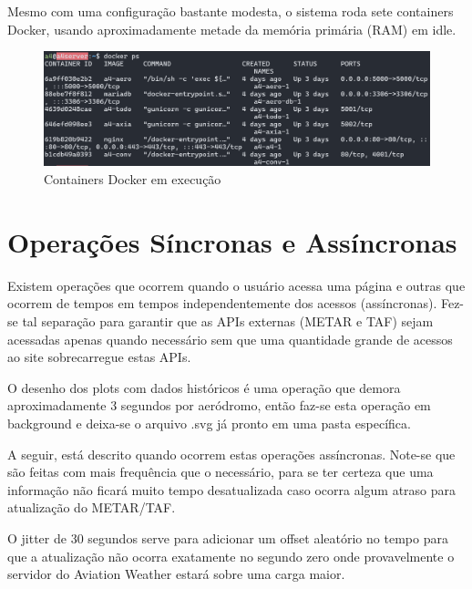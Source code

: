 Mesmo com uma configuração bastante modesta, o sistema roda sete containers Docker, usando 
aproximadamente metade da memória primária (RAM) em idle.

\begin{figure}[ht]
    \begin{center}
    \includegraphics[width=400pt]{img/containers.png}
    \caption{Containers Docker em execução}
    \label{fig:containers}
    \end{center}
\end{figure}

\section{Operações Síncronas e Assíncronas}

Existem operações que ocorrem quando o usuário acessa uma página e outras que
ocorrem de tempos em tempos independentemente dos acessos (assíncronas). Fez-se
tal separação para garantir que as APIs externas (METAR e TAF) sejam acessadas 
apenas quando
necessário sem que uma quantidade grande de acessos ao site sobrecarregue estas APIs.

O desenho dos plots com dados históricos é uma operação que demora aproximadamente
3 segundos por aeródromo, então faz-se esta operação em background e deixa-se o 
arquivo .svg já pronto em uma pasta específica.

A seguir, está descrito quando ocorrem estas operações assíncronas. Note-se que são
feitas com mais frequência que o necessário, para se ter certeza que uma informação não
ficará muito tempo desatualizada caso ocorra algum atraso para atualização do METAR/TAF.

O jitter de 30 segundos serve para adicionar um offset aleatório no tempo para que
a atualização não ocorra exatamente no segundo zero onde provavelmente o servidor
do Aviation Weather estará sobre uma carga maior.

